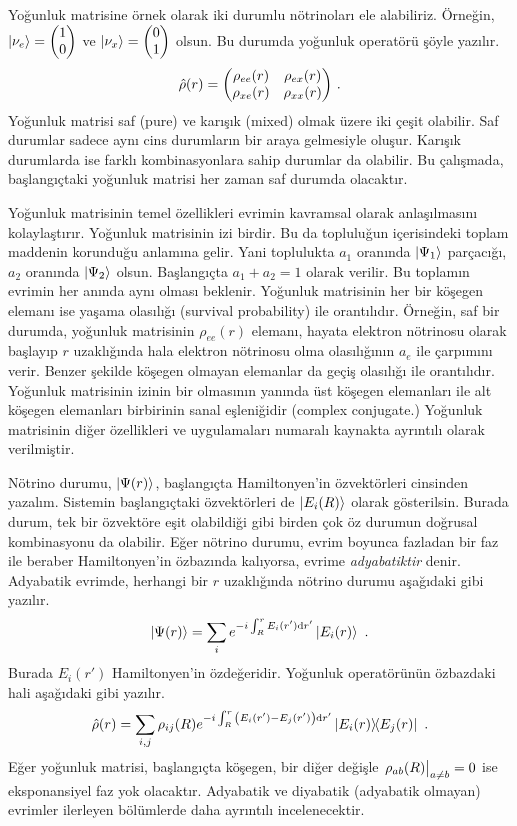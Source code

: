 Yoğunluk matrisine örnek olarak iki durumlu nötrinoları ele alabiliriz. Örneğin, $ \ket{\nu_{e}} = \mqty(1\\0) $ ve $ \ket{\nu_{x}} = \mqty(0\\1) $ olsun. Bu durumda yoğunluk operatörü şöyle yazılır.
\begin{equation}
	\hat{\rho}(r) = \mqty(\rho_{ee}(r) & \rho_{ex}(r) \\\rho_{xe}(r) & \rho_{xx}(r)) \text{ .}
\end{equation}
Yoğunluk matrisi saf (pure) ve karışık (mixed) olmak üzere iki çeşit olabilir. Saf durumlar sadece aynı cins durumların bir araya gelmesiyle oluşur. Karışık durumlarda ise farklı kombinasyonlara sahip durumlar da olabilir. Bu çalışmada, başlangıçtaki yoğunluk matrisi her zaman saf durumda olacaktır.

Yoğunluk matrisinin temel özellikleri evrimin kavramsal olarak anlaşılmasını kolaylaştırır. Yoğunluk matrisinin izi birdir. Bu da topluluğun içerisindeki toplam maddenin korunduğu anlamına gelir. Yani toplulukta $ a_{1} $ oranında $ \ket{\Psi_{1}} $ parçacığı, $ a_{2} $ oranında $ \ket{\Psi_{2}} $ olsun. Başlangıçta $ a_{1}+a_{2} =1 $ olarak verilir. Bu toplamın evrimin her anında aynı olması beklenir. Yoğunluk matrisinin her bir köşegen elemanı ise yaşama olasılığı (survival probability) ile orantılıdır. Örneğin, saf bir durumda, yoğunluk matrisinin $ \rho_{ee}(r) $ elemanı, hayata elektron nötrinosu olarak başlayıp $ r $ uzaklığında hala elektron nötrinosu olma olasılığının $ a_{e} $ ile çarpımını verir. Benzer şekilde köşegen olmayan elemanlar da geçiş olasılığı ile orantılıdır. Yoğunluk matrisinin izinin bir olmasının yanında üst köşegen elemanları ile alt köşegen elemanları birbirinin sanal eşleniğidir (complex conjugate.) Yoğunluk matrisinin diğer özellikleri ve uygulamaları \cite{2012dmta.book.....B} numaralı kaynakta ayrıntılı olarak verilmiştir.

Nötrino durumu, $ \ket{\Psi(r)} $, başlangıçta Hamiltonyen'in özvektörleri cinsinden yazalım. Sistemin başlangıçtaki özvektörleri de $ \ket{E_{i}(R)} $ olarak gösterilsin. Burada durum, tek bir özvektöre eşit olabildiği gibi birden çok öz durumun doğrusal kombinasyonu da olabilir. Eğer nötrino durumu, evrim boyunca fazladan bir faz ile beraber Hamiltonyen'in özbazında kalıyorsa, evrime \emph{adyabatiktir} denir. Adyabatik evrimde, herhangi bir $ r $ uzaklığında nötrino durumu aşağıdaki gibi yazılır.
\begin{equation}\label{eqn:Psi_rAdiabaticPhase}
    \ket{\Psi(r)} = \sum_{i} e^{-i \int^{r}_{R} E_{i}(r') \dd{r'}} \ket{E_{i}(r)} \text{ .}
\end{equation}
Burada $ E_{i}(r') $ Hamiltonyen'in özdeğeridir. Yoğunluk operatörünün özbazdaki hali aşağıdaki gibi yazılır.
\begin{equation}\label{eqn:rhoHat_rAdiabaticPhase}
    \hat{\rho}(r) = \sum_{i,j} \rho_{ij}(R) e^{-i \int^{r}_{R} \qty(E_{i}(r')-E_{j}(r')) \dd{r'}} \dyad{E_{i}(r)}{E_{j}(r)} \text{ .}
\end{equation}
Eğer yoğunluk matrisi, başlangıçta köşegen, bir diğer değişle $ \eval{\rho_{ab}(R)}_{a\ne b}=0  $ ise eksponansiyel faz yok olacaktır. Adyabatik ve diyabatik (adyabatik olmayan) evrimler ilerleyen bölümlerde daha ayrıntılı incelenecektir.

